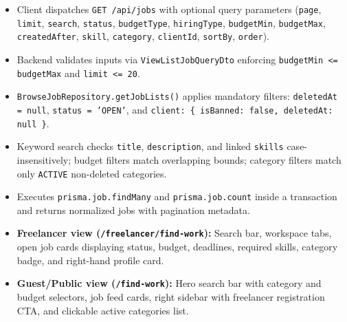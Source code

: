 \begin{itemize}[leftmargin=1.6em,topsep=3pt,itemsep=2pt,parsep=0pt,label=$\bullet$]
    \item Client dispatches \texttt{GET /api/jobs} with optional query parameters (\texttt{page}, \texttt{limit}, \texttt{search}, \texttt{status}, \texttt{budgetType}, \texttt{hiringType}, \texttt{budgetMin}, \texttt{budgetMax}, \texttt{createdAfter}, \texttt{skill}, \texttt{category}, \texttt{clientId}, \texttt{sortBy}, \texttt{order}).
    \item Backend validates inputs via \texttt{ViewListJobQueryDto} enforcing \texttt{budgetMin <= budgetMax} and \texttt{limit <= 20}.
    \item \texttt{BrowseJobRepository.getJobLists()} applies mandatory filters: \texttt{deletedAt = null}, \texttt{status = 'OPEN'}, and \texttt{client: \{ isBanned: false, deletedAt: null \}}.
    \item Keyword search checks \texttt{title}, \texttt{description}, and linked \texttt{skills} case-insensitively; budget filters match overlapping bounds; category filters match only \texttt{ACTIVE} non-deleted categories.
    \item Executes \texttt{prisma.job.findMany} and \texttt{prisma.job.count} inside a transaction and returns normalized jobs with pagination metadata.
\end{itemize}

\begin{itemize}[leftmargin=1.6em,topsep=3pt,itemsep=2pt,parsep=0pt,label=$\bullet$]
    \item \textbf{Freelancer view (\texttt{/freelancer/find-work}):} Search bar, workspace tabs, open job cards displaying status, budget, deadlines, required skills, category badge, and right-hand profile card.
    \item \textbf{Guest/Public view (\texttt{/find-work}):} Hero search bar with category and budget selectors, job feed cards, right sidebar with freelancer registration CTA, and clickable active categories list.
\end{itemize}


